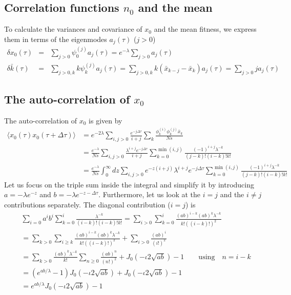 \documentclass[prl,preprint]{revtex4}
\newcommand{\x}{x}
\newcommand{\xs}{\bar{\x}}
\newcommand{\dx}{\delta \x}
\newcommand{\dk}{\delta \bar{k}}
\newcommand{\mr}[1]{\psi^{(#1)}}
\newcommand{\ml}[1]{\phi^{(#1)}}
\newcommand{\cp}{\iota}
\newcommand{\la}{\langle}
\newcommand{\ra}{\rangle}
\begin{document}
\subsection*{Correlation functions $n_0$ and the mean}
To calculate the variances and covariance of $\x_0$ and the mean fitness, we express them in terms of the eigenmodes $a_j(\tau)$ ($j>0$)
\begin{eqnarray}
\dx_0(\tau) &=& \sum_{j>0} \mr{j}_0 a_j(\tau)  = e^{-\lambda} \sum_{j>0} a_j(\tau)\\
\dk(\tau) &=& \sum_{j>0,k} k\mr{j}_k a_j(\tau) = \sum_{j>0,k} k(\xs_{k-j}-\xs_k) a_j(\tau) =  \sum_{j>0} j a_j(\tau)
\end{eqnarray}

\subsection*{The auto-correlation of $\x_0$}
The auto-correlation of $\x_0$ is given by
\begin{equation}
\label{eq:n0var}
\begin{split}
\la \x_0(\tau) \x_0(\tau+\Delta\tau)\ra &=  e^{-2\lambda} \sum_{i,j>0} \frac{e^{-j\Delta\tau}}{i+j}\sum_{k} \frac{\ml{i}_k\ml{j}_k\xs_k}{Ns} \\
& = \frac{e^{-\lambda}}{Ns} \sum_{i,j>0} \frac{\lambda^{i+j}e^{-j\Delta\tau}}{i+j}\sum_{k=0}^{\min(i,j)} \frac{(-1)^{i+j}\lambda^{-k}}{(j-k)!(i-k)!k!} \\
& = \frac{e^{-\lambda}}{Ns} \int_0^\infty dz \sum_{i,j>0} e^{-z(i+j)}\lambda^{i+j}e^{-j\Delta\tau}\sum_{k=0}^{\min(i,j)} \frac{(-1)^{i+j}\lambda^{-k}}{(j-k)!(i-k)!k!} 
\end{split}
\end{equation}
Let us focus on the triple sum inside the integral and simplify it by introducing $a=-\lambda e^{-z}$ and $b=-\lambda e^{-z-\Delta\tau}$. Furthermore, let us look at the $i=j$ and the $i\neq j$ contributions separately. The diagonal contribution  ($i=j$) is
\begin{equation}
\begin{split}
&\sum_{i=0} a^ib^i \sum_{k=0}^{i} \frac{\lambda^{-k}}{(i-k)!(i-k)!k!} = \sum_{i>0} \sum_{k=0}^{i} \frac{(ab)^{i-k}(ab)^{k}\lambda^{-k}}{k!((i-k)!)^2}\\
&=\sum_{k>0} \sum_{i\geq k} \frac{(ab)^{i-k}(ab)^{k}\lambda^{-k}}{k!((i-k)!)^2} + \sum_{i>0} \frac{(ab)^{i}}{(i!)^2} \\
&=\sum_{k>0} \frac{(ab)^{k}\lambda^{-k}}{k!}\sum_{n\geq 0} \frac{(ab)^{n}}{(n!)^2} + J_0(-\cp 2\sqrt{ab})-1   \quad\quad \mathrm{using}\quad n=i-k\\
&=(e^{ab/\lambda}-1)J_0(-\cp 2\sqrt{ab}) + J_0(-\cp 2\sqrt{ab})-1\\
&=e^{ab/\lambda} J_0(-\cp 2\sqrt{ab})-1
\end{split}
\end{equation}
\end{document}
